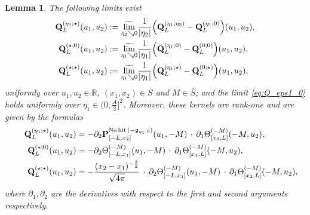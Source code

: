 \documentclass[oneside,final,11pt]{amsart}
\newtheorem{lem}[thm]{Lemma}
\theoremstyle{definition}
\newcommand\nohit{\uptext{No\! hit}}
\newcommand{\fg}{\mathfrak{g}}
\newcommand{\mylim}[1]{\underset{#1}{\wt{\mathrm{lim}}}}
\newcommand{\R}{\mathbb{R}}
\newcommand{\1}[1]{\mathbf{1}_{#1}}
\newcommand{\wt}{\widetilde}
\newcommand{\uptext}[1]{\text{\upshape{#1}}}
\newcommand{\fx}{x}
\newcommand{\fM}{M}
\newcommand{\fP}{\mathbf{P}}
\newcommand{\fQ}{\mathbf{Q}}
\numberwithin{equation}{section}
\begin{document}
\begin{lem}\label{lem:Q_limits}
The following limits exist
\begin{subequations}\label{eqs:Q_limits}
\begin{align}
\fQ_L^{(\eta_1; \star)}(u_1, u_2) &:= \mylim{\eta_2 \searrow 0} \frac{1}{|\eta_2|} \Bigl(\fQ_L^{(\eta_1; \eta_2)} - \fQ_L^{(\eta_1; 0)}\Bigr)(u_1, u_2),\label{eq:Q_eps1_0}\\
\fQ_L^{(\star; 0)}(u_1, u_2) &:= \mylim{\eta_1 \searrow 0} \frac{1}{|\eta_1|} \Bigl(\fQ_L^{(\eta_1; 0)} - \fQ_L^{(0; 0)}\Bigr)(u_1, u_2),\label{eq:Q_0_eps2} \\
\fQ_L^{(\star; \star)}(u_1, u_2) &:= \mylim{\eta_1 \searrow 0} \frac{1}{|\eta_1|} \Bigl(\fQ_L^{(\eta_1; \star)} - \fQ_L^{(0; \star)}\Bigr)(u_1, u_2),\label{eq:Q_0_0}
\end{align}
\end{subequations}
uniformly over $u_1, u_2 \in \R$, $(x_1, x_2) \in S$ and $M \in \bar S$; and the limit \eqref{eq:Q_eps1_0} holds uniformly over $\eta_1 \in (0, \frac{A}{2}]^2$. Moreover, these kernels are rank-one and are given by the formulas
\begin{subequations}
\label{eqs:Q_formulas}
\begin{align}
\hspace{0.5cm}\fQ_L^{(\eta_1; \star)}(u_1, u_2) &= -\partial_{2} \fP_{[-L,\fx_2]}^{\nohit\,(-\fg_{\eta_1, 0})} (u_1, -\fM)\, \cdot\,\partial_{1} \Theta^{(-\fM)}_{[\fx_2, L]} (-\fM, u_2),\label{eq:Q_eps1_0_formula}\\
\fQ_L^{(\star; 0)}(u_1, u_2) &= -\partial_{2} \Theta^{(-\fM)}_{[-L, \fx_1]} (u_1, -\fM)\, \cdot\, \partial_{1} \Theta^{(-\fM)}_{[\fx_1, L]} (-\fM, u_2),\label{eq:Q_0_eps2_formula} \\
\fQ_L^{(\star; \star)}(u_1, u_2) &= -\frac{(\fx_2 - \fx_1)^{-\frac{3}{2}}}{\sqrt{4\pi}}\, \cdot\, \partial_{2} \Theta^{(-\fM)}_{[-L, \fx_1]} (u_1, -\fM)\, \cdot\, \partial_{1} \Theta^{(-\fM)}_{[\fx_2, L]} (-\fM, u_2),\label{eq:Q_0_0_formula}
\end{align}
\end{subequations}
where $\partial_1, \partial_2$ are the derivatives with respect to the first and second arguments respectively.
\end{lem}
\end{document}
